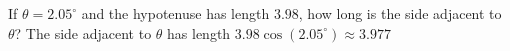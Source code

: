 {If $\theta = 2.05^{\circ}$ and the hypotenuse has length $3.98$, how long is the side adjacent to $\theta$?}
{The side adjacent to $\theta$ has length $3.98 \cos(2.05^{\circ}) \approx 3.977$}
